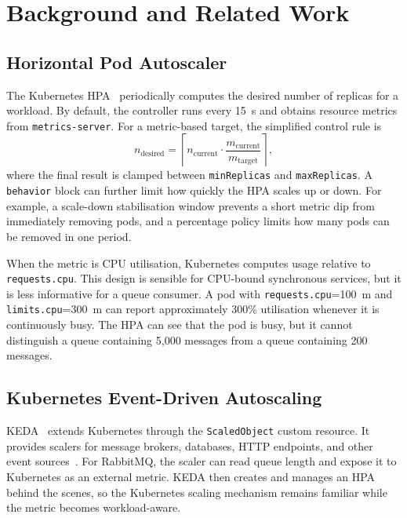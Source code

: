 \section{Background and Related Work}
\label{sec:background}

\subsection{Horizontal Pod Autoscaler}
\label{subsec:bg-hpa}
The Kubernetes HPA~\cite{kubernetes2024hpa} periodically computes the desired number of replicas for a workload. By default, the controller runs every 15~s and obtains resource metrics from \texttt{metrics-server}. For a metric-based target, the simplified control rule is
\begin{equation}
  \label{eq:hpa}
  n_\mathrm{desired} = \left\lceil n_\mathrm{current} \cdot
  \frac{m_\mathrm{current}}{m_\mathrm{target}} \right\rceil,
\end{equation}
where the final result is clamped between \texttt{minReplicas} and \texttt{maxReplicas}. A \texttt{behavior} block can further limit how quickly the HPA scales up or down. For example, a scale-down stabilisation window prevents a short metric dip from immediately removing pods, and a percentage policy limits how many pods can be removed in one period.

When the metric is CPU utilisation, Kubernetes computes usage relative to \texttt{requests.cpu}. This design is sensible for CPU-bound synchronous services, but it is less informative for a queue consumer. A pod with \texttt{requests.cpu}=100~m and \texttt{limits.cpu}=300~m can report approximately 300\% utilisation whenever it is continuously busy. The HPA can see that the pod is busy, but it cannot distinguish a queue containing 5,000 messages from a queue containing 200 messages.

\subsection{Kubernetes Event-Driven Autoscaling}
\label{subsec:bg-keda}
KEDA~\cite{keda2024} extends Kubernetes through the \texttt{ScaledObject} custom resource. It provides scalers for message brokers, databases, HTTP endpoints, and other event sources~\cite{keda2024scalers}. For RabbitMQ, the scaler can read queue length and expose it to Kubernetes as an external metric. KEDA then creates and manages an HPA behind the scenes, so the Kubernetes scaling mechanism remains familiar while the metric becomes workload-aware.

